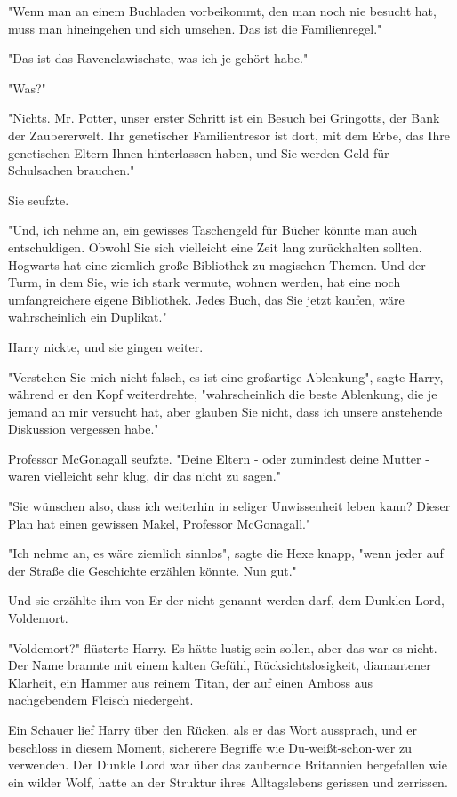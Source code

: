 {"Wenn man an einem Buchladen vorbeikommt, den man noch nie besucht hat, muss man hineingehen und sich umsehen. Das ist die Familienregel."

"Das ist das Ravenclawischste, was ich je gehört habe."

"Was?"

"Nichts. Mr. Potter, unser erster Schritt ist ein Besuch bei Gringotts, der Bank der Zaubererwelt. Ihr genetischer Familientresor ist dort, mit dem Erbe, das Ihre genetischen Eltern Ihnen hinterlassen haben, und Sie werden Geld für Schulsachen brauchen."

Sie seufzte.

"Und, ich nehme an, ein gewisses Taschengeld für Bücher könnte man auch entschuldigen. Obwohl Sie sich vielleicht eine Zeit lang zurückhalten sollten. Hogwarts hat eine ziemlich große Bibliothek zu magischen Themen. Und der Turm, in dem Sie, wie ich stark vermute, wohnen werden, hat eine noch umfangreichere eigene Bibliothek. Jedes Buch, das Sie jetzt kaufen, wäre wahrscheinlich ein Duplikat."

Harry nickte, und sie gingen weiter.

"Verstehen Sie mich nicht falsch, es ist eine großartige Ablenkung", sagte Harry, während er den Kopf weiterdrehte, "wahrscheinlich die beste Ablenkung, die je jemand an mir versucht hat, aber glauben Sie nicht, dass ich unsere anstehende Diskussion vergessen habe."

Professor McGonagall seufzte. "Deine Eltern - oder zumindest deine Mutter - waren vielleicht sehr klug, dir das nicht zu sagen."

"Sie wünschen also, dass ich weiterhin in seliger Unwissenheit leben kann? Dieser Plan hat einen gewissen Makel, Professor McGonagall."

"Ich nehme an, es wäre ziemlich sinnlos", sagte die Hexe knapp, "wenn jeder auf der Straße die Geschichte erzählen könnte. Nun gut."

Und sie erzählte ihm von Er-der-nicht-genannt-werden-darf, dem Dunklen Lord, Voldemort.

"Voldemort?" flüsterte Harry. Es hätte lustig sein sollen, aber das war es nicht. Der Name brannte mit einem kalten Gefühl, Rücksichtslosigkeit, diamantener Klarheit, ein Hammer aus reinem Titan, der auf einen Amboss aus nachgebendem Fleisch niedergeht.

Ein Schauer lief Harry über den Rücken, als er das Wort aussprach, und er beschloss in diesem Moment, sicherere Begriffe wie Du-weißt-schon-wer zu verwenden. Der Dunkle Lord war über das zaubernde Britannien hergefallen wie ein wilder Wolf, hatte an der Struktur ihres Alltagslebens gerissen und zerrissen.

}
